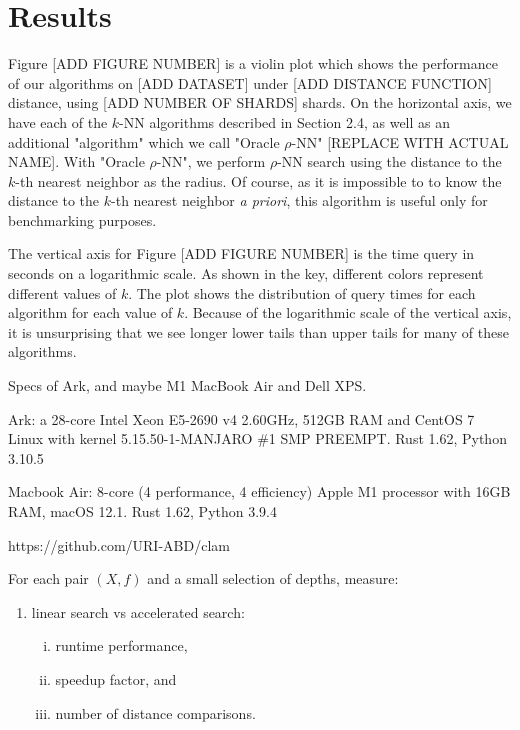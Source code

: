 \section{Results}
\label{sec:results}


Figure [ADD FIGURE NUMBER] is a violin plot which shows the performance of our algorithms
on [ADD DATASET] under [ADD DISTANCE FUNCTION] distance, using [ADD NUMBER OF SHARDS] shards.
On the horizontal axis, we have each of the $k$-NN algorithms described in Section 2.4, as well as  
an additional "algorithm" which we call "Oracle $\rho$-NN" [REPLACE WITH ACTUAL NAME].  With "Oracle $\rho$-NN", we perform $\rho$-NN search using the 
distance to the $k$-th nearest neighbor as the radius. Of course, as it is impossible to
to know the distance to the $k$-th nearest neighbor \emph{a priori}, this algorithm 
is useful only for benchmarking purposes.

The vertical axis for Figure [ADD FIGURE NUMBER] is the time query in seconds on a logarithmic scale. 
As shown in the key, different colors represent different values of $k$. 
The plot shows the distribution of query times for each algorithm for each value of $k$. 
Because of the logarithmic scale of the vertical axis, it is unsurprising that we 
see longer lower tails than upper tails for many of these algorithms. 

Specs of Ark, and maybe M1 MacBook Air and Dell XPS.

Ark: a 28-core Intel Xeon E5-2690 v4 2.60GHz, 512GB RAM and CentOS 7 Linux with kernel 5.15.50-1-MANJARO \#1 SMP PREEMPT. Rust 1.62, Python 3.10.5

Macbook Air: 8-core (4 performance, 4 efficiency) Apple M1 processor with 16GB RAM, macOS 12.1. Rust 1.62, Python 3.9.4

https://github.com/URI-ABD/clam

For each pair $(X, f)$ and a small selection of depths, measure:
\begin{enumerate}[1.]
    \item linear search vs accelerated search:
    \begin{enumerate}[i.]
        \item runtime performance,
        \item speedup factor, and
        \item number of distance comparisons.
    \end{enumerate}
\end{enumerate}

